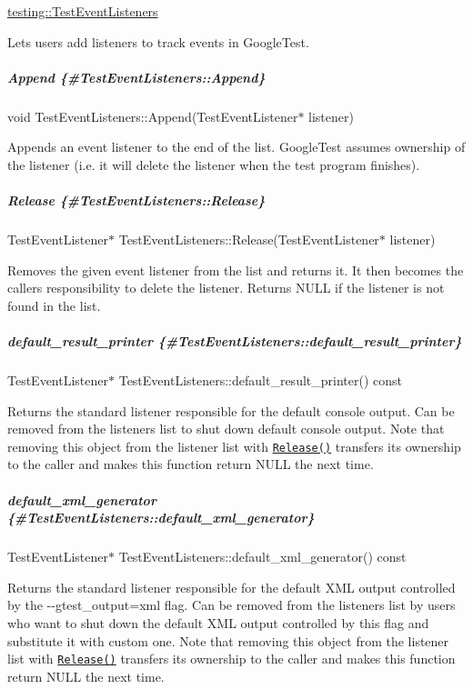 {\ttfamily \mbox{\hyperlink{classtesting_1_1TestEventListeners}{testing\+::\+Test\+Event\+Listeners}}}

Lets users add listeners to track events in Google\+Test.

\subparagraph*{Append \{\#\+Test\+Event\+Listeners\+::\+Append\}}

{\ttfamily void Test\+Event\+Listeners\+::\+Append(\+Test\+Event\+Listener$\ast$ listener)}

Appends an event listener to the end of the list. Google\+Test assumes ownership of the listener (i.\+e. it will delete the listener when the test program finishes).

\subparagraph*{Release \{\#\+Test\+Event\+Listeners\+::\+Release\}}

{\ttfamily Test\+Event\+Listener$\ast$ Test\+Event\+Listeners\+::\+Release(\+Test\+Event\+Listener$\ast$ listener)}

Removes the given event listener from the list and returns it. It then becomes the caller\textquotesingle{}s responsibility to delete the listener. Returns {\ttfamily N\+U\+LL} if the listener is not found in the list.

\subparagraph*{default\+\_\+result\+\_\+printer \{\#\+Test\+Event\+Listeners\+::default\+\_\+result\+\_\+printer\}}

{\ttfamily Test\+Event\+Listener$\ast$ Test\+Event\+Listeners\+::default\+\_\+result\+\_\+printer() const}

Returns the standard listener responsible for the default console output. Can be removed from the listeners list to shut down default console output. Note that removing this object from the listener list with \href{#TestEventListeners::Release}{\tt {\ttfamily Release()}} transfers its ownership to the caller and makes this function return {\ttfamily N\+U\+LL} the next time.

\subparagraph*{default\+\_\+xml\+\_\+generator \{\#\+Test\+Event\+Listeners\+::default\+\_\+xml\+\_\+generator\}}

{\ttfamily Test\+Event\+Listener$\ast$ Test\+Event\+Listeners\+::default\+\_\+xml\+\_\+generator() const}

Returns the standard listener responsible for the default X\+ML output controlled by the {\ttfamily -\/-\/gtest\+\_\+output=xml} flag. Can be removed from the listeners list by users who want to shut down the default X\+ML output controlled by this flag and substitute it with custom one. Note that removing this object from the listener list with \href{#TestEventListeners::Release}{\tt {\ttfamily Release()}} transfers its ownership to the caller and makes this function return {\ttfamily N\+U\+LL} the next time.

